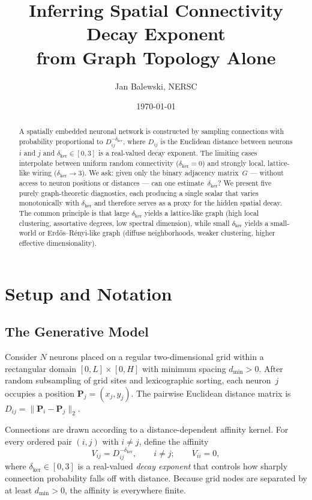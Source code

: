 \documentclass[11pt]{article}
\title{Inferring Spatial Connectivity Decay Exponent\\
from Graph Topology Alone}
\author{Jan Balewski, NERSC}
\date{\today}
\begin{document}
\maketitle

\begin{abstract}
A spatially embedded neuronal network is constructed by sampling
connections with probability proportional to
$D_{ij}^{-\delta_{\mathrm{ker}}}$, where $D_{ij}$ is the Euclidean
distance between neurons $i$ and $j$ and
$\delta_{\mathrm{ker}}\in[0,3]$ is a real-valued decay exponent.
The limiting cases interpolate between uniform random connectivity
($\delta_{\mathrm{ker}}=0$) and strongly local, lattice-like wiring
($\delta_{\mathrm{ker}}\to 3$).  We ask: given only the binary
adjacency matrix~$G$ --- without access to neuron positions or
distances --- can one estimate~$\delta_{\mathrm{ker}}$?
We present five purely graph-theoretic diagnostics, each producing a
single scalar that varies monotonically with $\delta_{\mathrm{ker}}$
and therefore serves as a proxy for the hidden spatial decay.
The common principle is that large $\delta_{\mathrm{ker}}$ yields a
lattice-like graph (high local clustering, assortative degrees, low
spectral dimension), while small $\delta_{\mathrm{ker}}$ yields a
small-world or Erd\H{o}s--R\'enyi-like graph (diffuse neighborhoods,
weaker clustering, higher effective dimensionality).
\end{abstract}

\tableofcontents
\newpage

\section{Setup and Notation}
\label{sec:setup}

\subsection{The Generative Model}
\label{sec:gen_model}

Consider $N$ neurons placed on a regular two-dimensional grid within a
rectangular domain $[0,L]\times[0,H]$ with minimum spacing
$d_{\min}>0$.  After random subsampling of grid sites and
lexicographic sorting, each neuron~$j$ occupies a position
$\mathbf{P}_j=(x_j,y_j)$.  The pairwise Euclidean distance matrix is
$D_{ij}=\|\mathbf{P}_i-\mathbf{P}_j\|_2$.

Connections are drawn according to a distance-dependent affinity
kernel.  For every ordered pair $(i,j)$ with $i\neq j$, define the
affinity
\begin{equation}
  V_{ij} = D_{ij}^{-\delta_{\mathrm{ker}}},
  \qquad i\neq j;\qquad V_{ii}=0,
  \label{eq:affinity}
\end{equation}
where $\delta_{\mathrm{ker}}\in[0,3]$ is a real-valued \emph{decay
exponent} that controls how sharply connection probability falls off
with distance.  Because grid nodes are separated by at least
$d_{\min}>0$, the affinity is everywhere finite.
\end{document}
